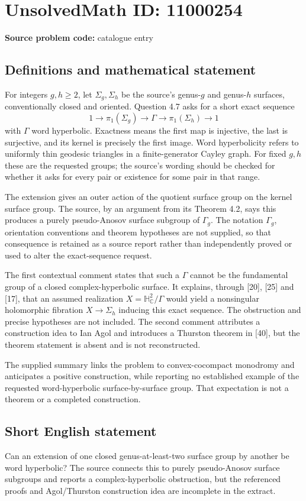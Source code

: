 \documentclass[11pt]{article}
\newcommand{\C}{\mathbb{C}}
\begin{document}
\section*{UnsolvedMath ID: 11000254}
\textbf{Source problem code:} catalogue entry
\subsection{Definitions and mathematical statement}
For integers \(g,h\ge2\), let \(\Sigma_g,\Sigma_h\) be the source's genus-\(g\) and genus-\(h\) surfaces, conventionally closed and oriented. Question 4.7 asks for a short exact sequence
\[
 1\longrightarrow\pi_1(\Sigma_g)\longrightarrow\Gamma
       \longrightarrow\pi_1(\Sigma_h)\longrightarrow1
\]
with \(\Gamma\) word hyperbolic. Exactness means the first map is injective, the last is surjective, and its kernel is precisely the first image. Word hyperbolicity refers to uniformly thin geodesic triangles in a finite-generator Cayley graph. For fixed \(g,h\) these are the requested groups; the source's wording should be checked for whether it asks for every pair or existence for some pair in that range.

The extension gives an outer action of the quotient surface group on the kernel surface group. The source, by an argument from its Theorem 4.2, says this produces a purely pseudo-Anosov surface subgroup of \(\Gamma_g\). The notation \(\Gamma_g\), orientation conventions and theorem hypotheses are not supplied, so that consequence is retained as a source report rather than independently proved or used to alter the exact-sequence request.

The first contextual comment states that such a \(\Gamma\) cannot be the fundamental group of a closed complex-hyperbolic surface. It explains, through [20], [25] and [17], that an assumed realization \(X=\mathbb H^2_{\C}/\Gamma\) would yield a nonsingular holomorphic fibration \(X\to\Sigma_h\) inducing this exact sequence. The obstruction and precise hypotheses are not included. The second comment attributes a construction idea to Ian Agol and introduces a Thurston theorem in [40], but the theorem statement is absent and is not reconstructed.

The supplied summary links the problem to convex-cocompact monodromy and anticipates a positive construction, while reporting no established example of the requested word-hyperbolic surface-by-surface group. That expectation is not a theorem or a completed construction.
\subsection{Short English statement}
Can an extension of one closed genus-at-least-two surface group by another be word hyperbolic? The source connects this to purely pseudo-Anosov surface subgroups and reports a complex-hyperbolic obstruction, but the referenced proofs and Agol/Thurston construction idea are incomplete in the extract.
\end{document}
